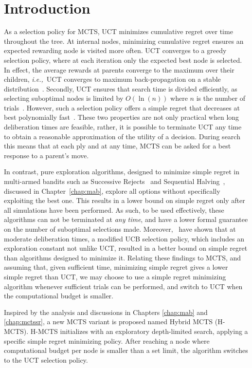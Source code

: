 \documentclass{kecsmstr}
\newcommand{\ie}{{\it i.e.,}~}
\begin{document}
\section{Introduction}
As a selection policy for MCTS, UCT minimizes cumulative regret over time throughout the tree. At internal nodes, minimizing cumulative regret ensures an expected rewarding node is visited more often. UCT converges to a greedy selection policy, where at each iteration only the expected best node is selected. In effect, the average rewards at parents converge to the maximum over their children, \ie UCT converges to maximum back-propagation on a stable distribution~. Secondly, UCT ensures that search time is divided efficiently, as selecting suboptimal nodes is limited by $O(\ln(n))$ where $n$ is the number of trials~. However, such a selection policy offers a simple regret that decreases at best polynomially fast~. These two properties are not only practical when long deliberation times are feasible, rather, it is possible to terminate UCT any time to obtain a reasonable approximation of the utility of a decision. During search this means that at each ply and at any time, MCTS can be asked for a best response to a parent's move.

In contrast, pure exploration algorithms, designed to minimize simple regret in multi-armed bandits such as Successive Rejects~ and Sequential Halving~, discussed in Chapter~\ref{chap:mab}, explore all options without specifically exploiting the best one. This results in a lower bound on simple regret only after all simulations have been performed. As such, to be used effectively, these algorithms can not be terminated at \emph{any time}, and have a lower formal guarantee on the number of suboptimal selections made. Moreover,~ have shown that at moderate deliberation times, a modified UCB selection policy, which includes an exploration constant not unlike UCT, resulted in a better bound on simple regret than algorithms designed to minimize it. Relating these findings to MCTS, and assuming that, given sufficient time, minimizing simple regret gives a lower simple regret than UCT, we may choose to use a simple regret minimizing algorithm whenever sufficient trials can be performed, and switch to UCT when the computational budget is smaller.

Inspired by the analysis and discussions in Chapters \ref{chap:mab} and \ref{chap:mctssr}, a new MCTS variant is proposed named Hybrid MCTS (H-MCTS). H-MCTS initializes with an exploratory depth-limited search, applying a specific simple regret minimizing policy. After reaching a node where computational budget per node is smaller than a set limit, the algorithm switches to the UCT selection policy. 
\vspace{2 mm}
\end{document}

